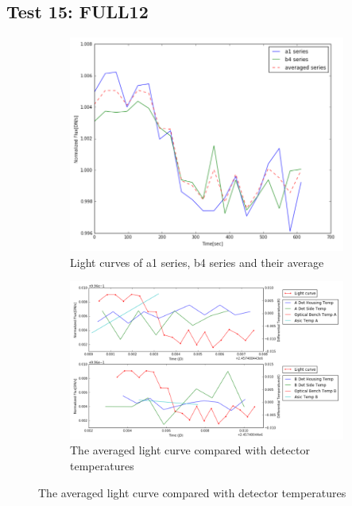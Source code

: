 \documentclass[conference]{IEEEtran}
\begin{document}
\subsection{Test 15: FULL12} 
\begin{figure}[H]
    \centering
    \begin{subfigure}{1}
        \includegraphics[scale=0.4]{ts_test15}
        \caption{Light curves of a1 series, b4 series and their average}
    \end{subfigure}

    \begin{subfigure}{2}
        \includegraphics[scale=0.4]{temp_test15}
        \caption{The averaged light curve compared with detector temperatures}
    \end{subfigure}
   

\end{figure}
\end{document}
